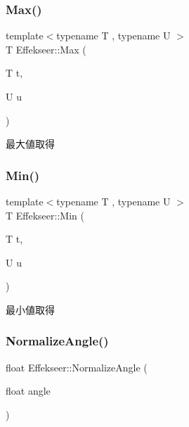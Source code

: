 \subsubsection{\texorpdfstring{Max()}{Max()}}
{\footnotesize\ttfamily template$<$typename T , typename U $>$ \\
T Effekseer\+::\+Max (\begin{DoxyParamCaption}\item[{T}]{t,  }\item[{U}]{u }\end{DoxyParamCaption})}



最大値取得 

\mbox{\label{namespace_effekseer_ad4d523c19d4088c7566fadd84449eba7}} 
\subsubsection{\texorpdfstring{Min()}{Min()}}
{\footnotesize\ttfamily template$<$typename T , typename U $>$ \\
T Effekseer\+::\+Min (\begin{DoxyParamCaption}\item[{T}]{t,  }\item[{U}]{u }\end{DoxyParamCaption})}



最小値取得 

\mbox{\label{namespace_effekseer_a6607039efc8f6bb91f8c216dfd096c5c}} 
\subsubsection{\texorpdfstring{Normalize\+Angle()}{NormalizeAngle()}}
{\footnotesize\ttfamily float Effekseer\+::\+Normalize\+Angle (\begin{DoxyParamCaption}\item[{float}]{angle }\end{DoxyParamCaption})\hspace{0.3cm}{\ttfamily [inline]}}

\mbox{\label{namespace_effekseer_a4eab7724e1fc9c1cb66aac61b3d568d9}} 

